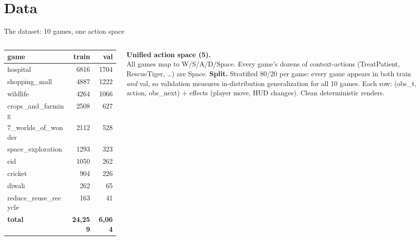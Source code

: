 \documentclass[aspectratio=169,11pt]{beamer}
\newcommand{\code}[1]{{\ttfamily\small #1}}
\begin{document}
\section{Data}
\begin{frame}{The dataset: 10 games, one action space}
  \begin{columns}[T]
    \small
    \begin{tabular}{@{}lrr@{}}
      \toprule
      game & train & val \\
      \midrule
      hospital            & 6816 & 1704 \\
      shopping\_mall      & 4887 & 1222 \\
      wildlife            & 4264 & 1066 \\
      crops\_and\_farming & 2508 &  627 \\
      7\_worlds\_of\_wonder & 2112 & 528 \\
      space\_exploration  & 1293 &  323 \\
      eid                 & 1050 &  262 \\
      cricket             &  904 &  226 \\
      diwali              &  262 &   65 \\
      reduce\_reuse\_recycle & 163 &  41 \\
      \midrule
      \textbf{total} & \textbf{24{,}259} & \textbf{6{,}064} \\
      \bottomrule
    \end{tabular}
      \textbf{Unified action space (5).}\\
      All games map to \code{W/S/A/D/Space}. Every game's dozens of
      context-actions (TreatPatient, RescueTiger, \dots) are \code{Space}.
      \vspace{0.6em}
      \textbf{Split.} Stratified \alert{80/20 per game}: every game appears in
      both train \emph{and} val, so validation measures in-distribution
      generalization for all 10 games.
      \vspace{0.6em}
      Each row: \code{(obs\_t, action, obs\_next)} $+$ effects (player move, HUD
      changes). Clean deterministic renders.
  \end{columns}
\end{frame}
\end{document}
